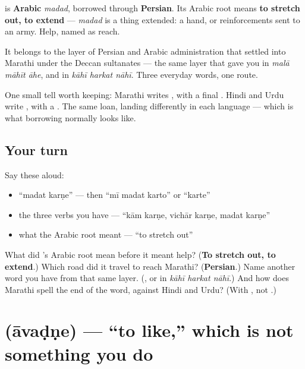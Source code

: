 \begin{cousinweb}
\textbf{} is \textbf{Arabic} \emph{madad}, borrowed through \textbf{Persian}. Its Arabic root means \textbf{to stretch out, to extend} — \emph{madad} is a thing extended: a hand, or reinforcements sent to an army. Help, named as reach.

It belongs to the layer of Persian and Arabic administration that settled into Marathi under the Deccan sultanates — the same layer that gave you \textbf{} in \emph{malā māhīt āhe}, and \textbf{} in \emph{kāhī harkat nāhī}. Three everyday words, one route.

One small tell worth keeping: Marathi writes \textbf{}, with a final \textbf{}. Hindi and Urdu write \textbf{}, with a \textbf{}. The same loan, landing differently in each language — which is what borrowing normally looks like.
\end{cousinweb}

\subsection*{Your turn}
Say these aloud:

\begin{itemize}
\raggedright
  \item \textquotedblleft{}madat karṇe\textquotedblright{} — then \textquotedblleft{}mī madat karto\textquotedblright{} or \textquotedblleft{}karte\textquotedblright{}
  \item the three  verbs you have — \textquotedblleft{}kām karṇe, vichār karṇe, madat karṇe\textquotedblright{}
  \item what the Arabic root meant — \textquotedblleft{}to stretch out\textquotedblright{}
\end{itemize}

\begin{tcolorbox}[breakable,colback=teal!4,colframe=teal!35!black,title={Before you move on}]
What did \textbf{}'s Arabic root mean before it meant help? (\textbf{To stretch out, to extend}.) Which road did it travel to reach Marathi? (\textbf{Persian}.) Name another word you have from that same layer. (\textbf{}, or \textbf{} in \emph{kāhī harkat nāhī}.) And how does Marathi spell the end of the word, against Hindi and Urdu? (With \textbf{}, not \textbf{}.)
\end{tcolorbox}
\section[\texorpdfstring{\mr{आवडणे} (āvaḍṇe)}{आवडणे (āvaḍṇe)}]{ (āvaḍṇe) — \textquotedblleft{}to like,\textquotedblright{} which is not something you do}

